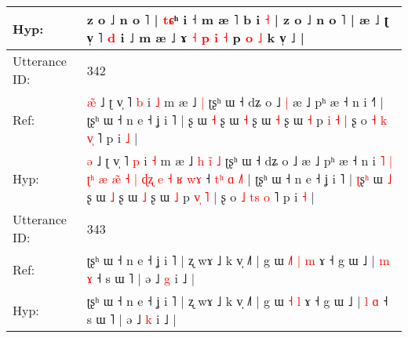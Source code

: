 \documentclass[10pt]{article}
\DeclareRobustCommand{\hl}[1]{{\textcolor{red}{#1}}}
\begin{document}
\begin{longtable}{ll}
 \\
Hyp: & z o ˩ n o ˥ | \hl{t}\hl{ɕ}ʰ i ˧ m æ ˥ b i \hl{˧} | z o ˩ n o ˥ | æ\hl{} ˩ ʈ v̩ ˥ \hl{d} i ˩ m æ ˩\hl{}\hl{} ɤ\hl{}\hl{} \hl{˧} \hl{p} \hl{i} \hl{˧} p \hl{o} \hl{˩} k v̩ ˩ |
 \\
\midrule
Utterance ID: & 342 \\
Ref: & \hl{æ}\hl{̃} ˩ ʈ v̩ ˥ \hl{b} i \hl{˩} m æ ˩\hl{}\hl{}\hl{}\hl{}\hl{} \hl{|} ʈʂʰ ɯ ˧ dʑ o ˩\hl{ }\hl{|} æ ˩ pʰ æ ˧ n i\hl{}\hl{}\hl{}\hl{}\hl{}\hl{}\hl{}\hl{}\hl{}\hl{}\hl{}\hl{}\hl{}\hl{}\hl{}\hl{}\hl{}\hl{}\hl{}\hl{}\hl{}\hl{}\hl{}\hl{}\hl{}\hl{}\hl{}\hl{} ˧\hl{}\hl{}\hl{}\hl{}\hl{}\hl{}\hl{}˥ | ʈʂʰ ɯ ˧ n e ˧ ʝ i ˥ | \hl{}ʂ\hl{} ɯ \hl{˧} ʂ ɯ \hl{˧} ʂ ɯ \hl{˧} ʂ ɯ \hl{˧} p \hl{}\hl{i} \hl{˧} | ʂ o \hl{˧} \hl{k}\hl{ }\hl{v}\hl{̩} ˥ p i \hl{˩} |
 \\
Hyp: & \hl{}\hl{ə} ˩ ʈ v̩ ˥ \hl{p} i \hl{˧} m æ ˩\hl{ }\hl{h}\hl{ }\hl{i}\hl{̃} \hl{˩} ʈʂʰ ɯ ˧ dʑ o ˩\hl{}\hl{} æ ˩ pʰ æ ˧ n i\hl{ }\hl{˥}\hl{ }\hl{|}\hl{ }\hl{ʈ}\hl{ʰ}\hl{ }\hl{æ}\hl{ }\hl{æ}\hl{̃}\hl{ }\hl{˧}\hl{ }\hl{|}\hl{ }\hl{ɖ}\hl{ʐ}\hl{ }\hl{e}\hl{ }\hl{˧}\hl{ }\hl{ʁ}\hl{ }\hl{w}\hl{ɤ} ˧\hl{ }\hl{t}\hl{ʰ}\hl{ }\hl{ɑ}\hl{ }\hl{˩}˥ | ʈʂʰ ɯ ˧ n e ˧ ʝ i ˥ | \hl{ʈ}ʂ\hl{ʰ} ɯ \hl{˩} ʂ ɯ \hl{˩} ʂ ɯ \hl{˩} ʂ ɯ \hl{˩} p \hl{v}\hl{̩} \hl{˥} | ʂ o \hl{˩} \hl{t}\hl{s}\hl{ }\hl{o} ˥ p i \hl{˧} |
 \\
\midrule
Utterance ID: & 343 \\
Ref: & ʈʂʰ ɯ ˧ n e ˧ ʝ i ˥ | ʐ wɤ ˩ k v̩ ˩˥ | g ɯ\hl{ }\hl{˩}\hl{˥} \hl{|} \hl{m} ɤ ˧ g ɯ ˩ | \hl{m} \hl{ɤ} ˧ s ɯ ˥ | ə ˩ \hl{g} i ˩ |
 \\
Hyp: & ʈʂʰ ɯ ˧ n e ˧ ʝ i ˥ | ʐ wɤ ˩ k v̩ ˩˥ | g ɯ\hl{}\hl{}\hl{} \hl{˧} \hl{l} ɤ ˧ g ɯ ˩ | \hl{l} \hl{ɑ} ˧ s ɯ ˥ | ə ˩ \hl{k} i ˩ |
 \\
\midrule
\end{longtable}
\end{document}
